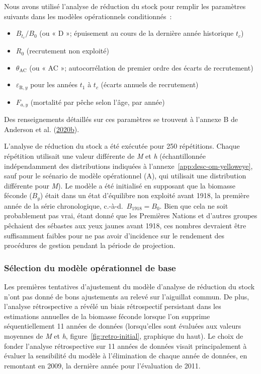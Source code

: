 \documentclass[french,11pt]{book}
\begin{document}
Nous avons utilisé l'analyse de réduction du stock pour remplir les paramètres suivants dans les modèles opérationnels conditionnés~:
\begin{itemize}

\item
  \(B_{t_c}/B_0\) (ou « D »; épuisement au cours de la dernière année historique \(t_c\))
\item
  \(R_0\) (recrutement non exploité)
\item
  \(\theta_\textrm{AC}\) (ou « AC »; autocorrélation de premier ordre des écarts de recrutement)
\item
  \(\varepsilon_{\textrm{R},y}\) pour les années \(t_1\) à \(t_c\) (écarts annuels de recrutement)
\item
  \(F_{a,y}\) (mortalité par pêche selon l'âge, par année)
\end{itemize}
Des renseignements détaillés sur ces paramètres se trouvent à l'annexe B de Anderson et al. (\protect\hyperlink{ref-anderson2020gfmp}{2020b}).

L'analyse de réduction du stock a été exécutée pour 250 répétitions. Chaque répétition utilisait une valeur différente de \emph{M} et \emph{h} (échantillonnée indépendamment des distributions indiquées à l'annexe~\ref{app:desc-om-yelloweye}, sauf pour le scénario de modèle opérationnel (A), qui utilisait une distribution différente pour \emph{M}). Le modèle a été initialisé en supposant que la biomasse féconde (\(B_y\)) était dans un état d'équilibre non exploité avant 1918, la première année de la série chronologique, c.-à-d.~\(B_{1918} = B_0\). Bien que cela ne soit probablement pas vrai, étant donné que les Premières Nations et d'autres groupes pêchaient des sébastes aux yeux jaunes avant 1918, ces nombres devraient être suffisamment faibles pour ne pas avoir d'incidence sur le rendement des procédures de gestion pendant la période de projection.

\hypertarget{sec:approach3-conditioning-base-om}{%
\subsubsection{Sélection du modèle opérationnel de base}\label{sec:approach3-conditioning-base-om}}

Les premières tentatives d'ajustement du modèle d'analyse de réduction du stock n'ont pas donné de bons ajustements au relevé sur l'aiguillat commun. De plus, l'analyse rétrospective a révélé un biais rétrospectif persistant dans les estimations annuelles de la biomasse féconde lorsque l'on supprime séquentiellement 11 années de données (lorsqu'elles sont évaluées aux valeurs moyennes de \emph{M} et \emph{h}, figure~\ref{fig:retro-initial}, graphique du haut). Le choix de fonder l'analyse rétrospective sur 11 années de données visait principalement à évaluer la sensibilité du modèle à l'élimination de chaque année de données, en remontant en 2009, la dernière année pour l'évaluation de 2011.
\end{document}
